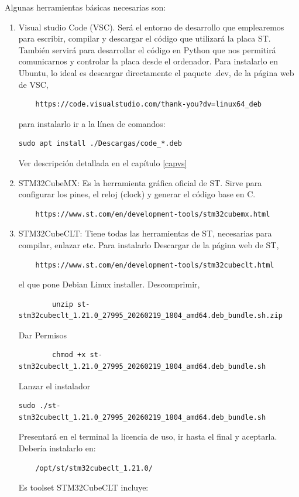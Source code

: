 \documentclass[10pt,a4paper]{report}
\begin{document}
Algunas herramientas básicas necesarias son:
\begin{enumerate}
	\item Visual studio Code (VSC).	
Será el entorno de desarrollo que emplearemos para escribir, compilar y descargar el código que utilizará la placa ST. También servirá para desarrollar el código en Python que nos permitirá comunicarnos y controlar la placa desde el ordenador. Para instalarlo en Ubuntu, lo ideal es descargar directamente el paquete .dev, de la página web de VSC,
\begin{verbatim}
	https://code.visualstudio.com/thank-you?dv=linux64_deb
\end{verbatim}
para instalarlo ir a la línea de comandos:
\begin{verbatim}
sudo apt install ./Descargas/code_*.deb	
\end{verbatim}

Ver descripción detallada en el capítulo \ref{capvs}
	
	\item STM32CubeMX: Es la herramienta gráfica oficial de ST. Sirve para 	configurar los pines, el reloj (clock) y generar el código base en C.
	\begin{verbatim}
	https://www.st.com/en/development-tools/stm32cubemx.html
	\end{verbatim}

	\item STM32CubeCLT:
	Tiene todas las herramientas de ST, necesarias para compilar, enlazar etc.
	Para instalarlo
	Descargar de la página web de ST,
	\begin{verbatim}
	https://www.st.com/en/development-tools/stm32cubeclt.html
	\end{verbatim}
	el que pone Debian Linux installer.
	Descomprimir,
	\begin{verbatim}
		unzip st-stm32cubeclt_1.21.0_27995_20260219_1804_amd64.deb_bundle.sh.zip
	\end{verbatim}
	Dar Permisos
	\begin{verbatim}
		chmod +x st-stm32cubeclt_1.21.0_27995_20260219_1804_amd64.deb_bundle.sh
	\end{verbatim}
Lanzar el instalador
\begin{verbatim}
sudo ./st-stm32cubeclt_1.21.0_27995_20260219_1804_amd64.deb_bundle.sh	
\end{verbatim}
Presentará en el terminal la licencia de uso, ir hasta el final y aceptarla.
Debería instalarlo en:
\begin{verbatim}
	/opt/st/stm32cubeclt_1.21.0/
\end{verbatim}
Es toolset STM32CubeCLT incluye:


\end{enumerate}
\end{document}
